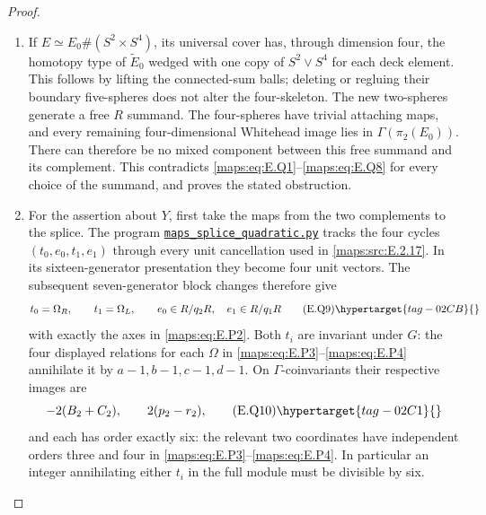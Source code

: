 \begin{proof}
\begin{enumerate}[label={$\langle1\rangle$\arabic*.},leftmargin=*]
\item If $E\simeq E_0\#(S^2\times S^4)$, its universal cover
has, through dimension four, the homotopy type of
$\widetilde E_0$ wedged with one copy of $S^2\vee S^4$
for each deck element.  This follows by lifting the
connected-sum balls; deleting or regluing their boundary
five-spheres does not alter the four-skeleton.  The new
two-spheres generate a free $R$ summand.  The four-spheres
have trivial attaching maps, and every remaining
four-dimensional Whitehead image lies in
$\Gamma(\pi_2(E_0))$.  There can therefore be no mixed
component between this free summand and its complement.
This contradicts \eqref{maps:eq:E.Q1}--\eqref{maps:eq:E.Q8} for every choice of the
summand, and proves the stated obstruction.

\item For the assertion about $Y$, first take the maps from the two complements to the splice.  The program \href{https://github.com/KokunoYumeto/s6-complex-structure-workbench/blob/83d76022bcd442278b760db9ff438afceed6c6ea/pro_returns/S6_10_PAPERS_checkpoint_15_20261119T1045Z/S6_10_PAPERS/code/III/maps_splice_quadratic.py}{\texttt{maps\_splice\_quadratic.py}} tracks the four cycles
$(t_0,e_0,t_1,e_1)$ through every unit cancellation used in
\ref{maps:src:E.2.17}.  In its sixteen-generator presentation they become four unit vectors.  The subsequent seven-generator
block changes therefore give
\[
 t_0=\Omega_R,\qquad t_1=\Omega_L,
 \qquad e_0\in R/q_2R,\quad e_1\in R/q_1R
 \tag{E.Q9}\hypertarget{tag-02CB}{}\label{maps:eq:E.Q9}
\]
with exactly the axes in \eqref{maps:eq:E.P2}.  
Both $t_i$ are invariant under $G$: the four displayed
relations for each $\Omega$ in \eqref{maps:eq:E.P3}--\eqref{maps:eq:E.P4} annihilate
it by $a-1,b-1,c-1,d-1$.  On $\Gamma$-coinvariants
their respective images are
\[
 -2(B_2+C_2),\qquad 2(p_2-r_2),
 \tag{E.Q10}\hypertarget{tag-02C1}{}\label{maps:eq:E.Q10}
\]
and each has order exactly six: the relevant two coordinates
have independent orders three and four in \eqref{maps:eq:E.P3}--\eqref{maps:eq:E.P4}.
In particular an integer annihilating either $t_i$ in the
full module must be divisible by six.


\end{enumerate}
\end{proof}
